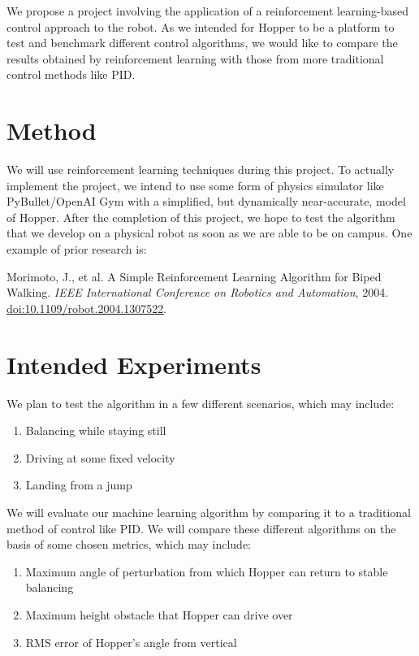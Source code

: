 \documentclass[12pt]{article}
\begin{document}
We propose a project involving the application of a reinforcement learning-based control approach to the robot. As we intended for Hopper to be a platform to test and benchmark different control algorithms, we would like to compare the results obtained by reinforcement learning with those from more traditional control methods like PID.

\section{Method}

We will use reinforcement learning techniques during this project. To actually implement the project, we intend to use some form of physics simulator like PyBullet/OpenAI Gym with a simplified, but dynamically near-accurate, model of Hopper. After the completion of this project, we hope to test the algorithm that we develop on a physical robot as soon as we are able to be on campus. One example of prior research is:

Morimoto, J., et al. A Simple Reinforcement Learning Algorithm for Biped Walking. \textit{IEEE International Conference on Robotics and Automation}, 2004. \href{https://doi.org/10.1109/robot.2004.1307522}{\underline{doi:10.1109/robot.2004.1307522}}. 

\section{Intended Experiments}

We plan to test the algorithm in a few different scenarios, which may include:
\begin{enumerate}
    \item Balancing while staying still
    \item Driving at some fixed velocity
    \item Landing from a jump
\end{enumerate}

We will evaluate our machine learning algorithm by comparing it to a traditional method of control like PID. We will compare these different algorithms on the basis of some chosen metrics, which may include:
\begin{enumerate}
    \item Maximum angle of perturbation from which Hopper can return to stable balancing
    \item Maximum height obstacle that Hopper can drive over
    \item RMS error of Hopper's angle from vertical
\end{enumerate}
\end{document}
